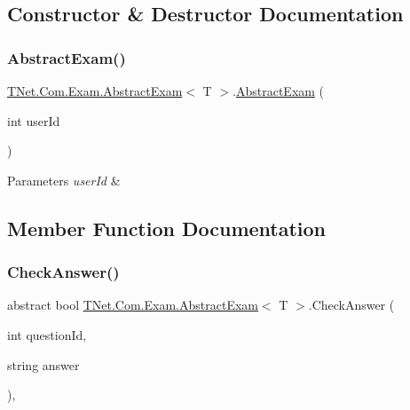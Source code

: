 \subsection{Constructor \& Destructor Documentation}
\mbox{\label{class_t_net_1_1_com_1_1_exam_1_1_abstract_exam_acce351b521a6313beced5eb3d2d86a6b}} 
\subsubsection{\texorpdfstring{Abstract\+Exam()}{AbstractExam()}}
{\footnotesize\ttfamily \mbox{\hyperlink{class_t_net_1_1_com_1_1_exam_1_1_abstract_exam}{T\+Net.\+Com.\+Exam.\+Abstract\+Exam}}$<$ T $>$.\mbox{\hyperlink{class_t_net_1_1_com_1_1_exam_1_1_abstract_exam}{Abstract\+Exam}} (\begin{DoxyParamCaption}\item[{int}]{user\+Id }\end{DoxyParamCaption})\hspace{0.3cm}{\ttfamily [protected]}}






\begin{DoxyParams}{Parameters}
{\em user\+Id} & \\
\hline
\end{DoxyParams}


\subsection{Member Function Documentation}
\mbox{\label{class_t_net_1_1_com_1_1_exam_1_1_abstract_exam_a98039563cff59a78dd2f9bb3d1036123}} 
\subsubsection{\texorpdfstring{Check\+Answer()}{CheckAnswer()}}
{\footnotesize\ttfamily abstract bool \mbox{\hyperlink{class_t_net_1_1_com_1_1_exam_1_1_abstract_exam}{T\+Net.\+Com.\+Exam.\+Abstract\+Exam}}$<$ T $>$.Check\+Answer (\begin{DoxyParamCaption}\item[{int}]{question\+Id,  }\item[{string}]{answer }\end{DoxyParamCaption})\hspace{0.3cm}{\ttfamily [protected]}, {}}



